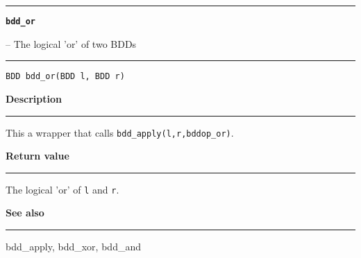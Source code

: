 \begin{minipage}{\textwidth}

\noindent\begin{minipage}{\textwidth}
\rule{\textwidth}{0.5mm}
{\tt\bf bdd\_or }
\--- The logical 'or' of two BDDs  \hspace{\fill}
\\\rule[1.5ex]{\textwidth}{0.5mm}
\end{minipage}

\noindent\begin{verbatim}
BDD bdd_or(BDD l, BDD r) 
\end{verbatim}

\vspace{\parsep}\noindent
{\bf Description}\\\rule[1.5ex]{\textwidth}{0.2mm}\vspace{-1.5ex}\setlength{\parindent}{1em}
This a wrapper that calls {\tt bdd\_apply(l,r,bddop\_or)}. 

\setlength{\parindent}{0em}\vspace{\parsep}\vspace{\baselineskip}\noindent
{\bf Return value}\\\rule[1.5ex]{\textwidth}{0.2mm}\vspace{-1.5ex}
The logical 'or' of {\tt l} and {\tt r}. 

\vspace{\parsep}\vspace{\baselineskip}\noindent
{\bf See also}\\\rule[1.5ex]{\textwidth}{0.2mm}\vspace{-1.5ex}
bdd\_apply, bdd\_xor, bdd\_and 
\end{minipage}
\vspace{8ex}
